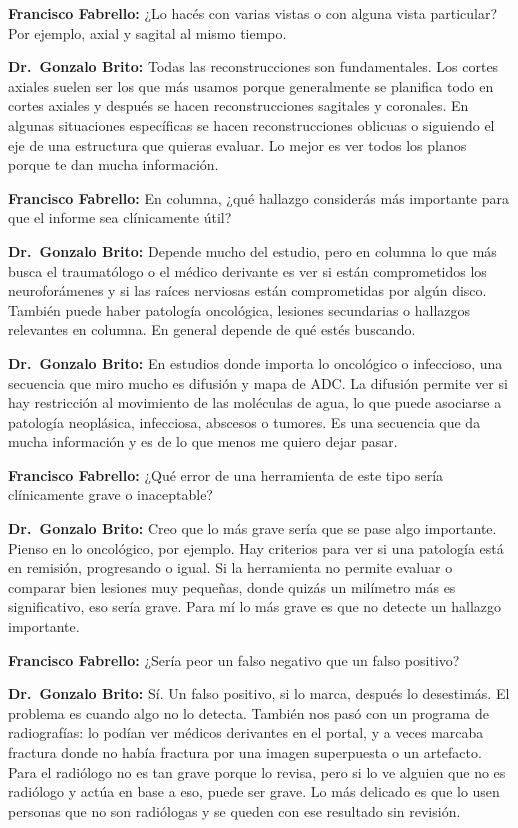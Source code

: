 \noindent\textbf{Francisco Fabrello:} ¿Lo hacés con varias vistas o con alguna vista particular? Por ejemplo, axial y sagital al mismo tiempo.

\noindent\textbf{Dr.~Gonzalo Brito:} Todas las reconstrucciones son fundamentales. Los cortes axiales suelen ser los que más usamos porque generalmente se planifica todo en cortes axiales y después se hacen reconstrucciones sagitales y coronales. En algunas situaciones específicas se hacen reconstrucciones oblicuas o siguiendo el eje de una estructura que quieras evaluar. Lo mejor es ver todos los planos porque te dan mucha información.

\noindent\textbf{Francisco Fabrello:} En columna, ¿qué hallazgo considerás más importante para que el informe sea clínicamente útil?

\noindent\textbf{Dr.~Gonzalo Brito:} Depende mucho del estudio, pero en columna lo que más busca el traumatólogo o el médico derivante es ver si están comprometidos los neuroforámenes y si las raíces nerviosas están comprometidas por algún disco. También puede haber patología oncológica, lesiones secundarias o hallazgos relevantes en columna. En general depende de qué estés buscando.

\noindent\textbf{Dr.~Gonzalo Brito:} En estudios donde importa lo oncológico o infeccioso, una secuencia que miro mucho es difusión y mapa de ADC. La difusión permite ver si hay restricción al movimiento de las moléculas de agua, lo que puede asociarse a patología neoplásica, infecciosa, abscesos o tumores. Es una secuencia que da mucha información y es de lo que menos me quiero dejar pasar.

\noindent\textbf{Francisco Fabrello:} ¿Qué error de una herramienta de este tipo sería clínicamente grave o inaceptable?

\noindent\textbf{Dr.~Gonzalo Brito:} Creo que lo más grave sería que se pase algo importante. Pienso en lo oncológico, por ejemplo. Hay criterios para ver si una patología está en remisión, progresando o igual. Si la herramienta no permite evaluar o comparar bien lesiones muy pequeñas, donde quizás un milímetro más es significativo, eso sería grave. Para mí lo más grave es que no detecte un hallazgo importante.

\noindent\textbf{Francisco Fabrello:} ¿Sería peor un falso negativo que un falso positivo?

\noindent\textbf{Dr.~Gonzalo Brito:} Sí. Un falso positivo, si lo marca, después lo desestimás. El problema es cuando algo no lo detecta. También nos pasó con un programa de radiografías: lo podían ver médicos derivantes en el portal, y a veces marcaba fractura donde no había fractura por una imagen superpuesta o un artefacto. Para el radiólogo no es tan grave porque lo revisa, pero si lo ve alguien que no es radiólogo y actúa en base a eso, puede ser grave. Lo más delicado es que lo usen personas que no son radiólogas y se queden con ese resultado sin revisión.

